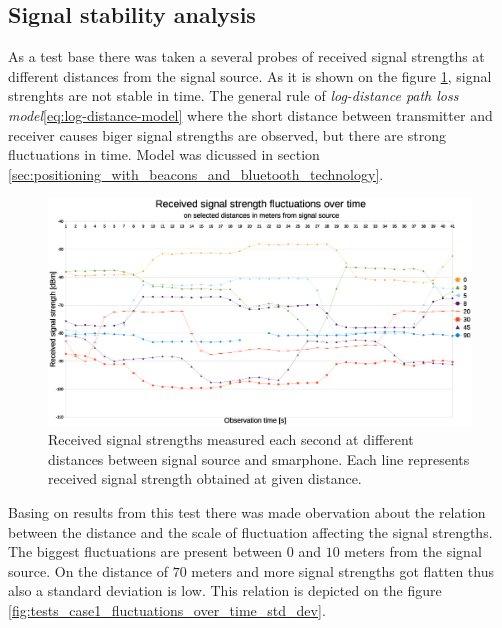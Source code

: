 \documentclass[../main.tex]{subfiles}
\begin{document}
\subsection{Signal stability analysis} %
\label{sub:signal_stability_analysis}

As a test base there was taken a several probes of received signal strengths at different distances from the signal source. As it is shown on the figure \ref{fig:tests_case1_fluctuations_over_time}, signal strenghts are not stable in time. The general rule of \textit{log-distance path loss model}\ref{eq:log-distance-model} where the short distance between transmitter and receiver causes biger signal strengths are observed, but there are strong fluctuations in time. Model was dicussed in section \ref{sec:positioning_with_beacons_and_bluetooth_technology}.

\begin{figure}[!htbp]
\includegraphics[width=\textwidth, keepaspectratio]{pictures/tests_case1_fluctuations_over_time}
\centering
\caption{Received signal strengths measured each second at different distances between signal source and smarphone. Each line represents received signal strength obtained at given distance.}
\label{fig:tests_case1_fluctuations_over_time}
\end{figure}

Basing on results from this test there was made obervation about the relation between the distance and the scale of fluctuation affecting the signal strengths. The biggest fluctuations are present between $0$ and $10$ meters from the signal source. On the distance of $70$ meters and more signal strengths got flatten thus also a standard deviation is low. This relation is depicted on the figure \ref{fig:tests_case1_fluctuations_over_time_std_dev}.
\end{document}
